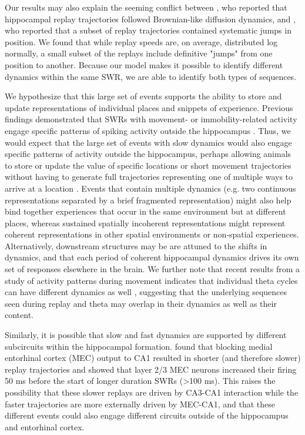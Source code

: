 \documentclass[9pt,lineno]{elife}
\begin{document}
Our results may also explain the seeming conflict between \cite{StellaHippocampalReactivationRandom2019}, who reported that hippocampal replay trajectories followed Brownian-like diffusion dynamics, and \cite{PfeifferAutoassociativedynamicsgeneration2015}, who reported that a subset of replay trajectories contained systematic jumps in position. We found that while replay speeds are, on average, distributed log normally, a small subset of the replays include definitive "jumps" from one position to another. Because our model makes it possible to identify different dynamics within the same SWR, we are able to identify both types of sequences.

We hypothesize that this large set of events supports the ability to store and update representations of individual places and snippets of experience. Previous findings demonstrated that SWRs with movement- or immobility-related activity engage specific patterns of spiking activity outside the hippocampus \citep{JadhavCoordinatedExcitationInhibition2016, YuDistincthippocampalcorticalmemory2017}. Thus, we would expect that the large set of events with slow dynamics would also engage specific patterns of activity outside the hippocampus, perhaps allowing animals to store or update the value of specific locations or short movement trajectories without having to generate full trajectories representing one of multiple ways to arrive at a location \citep{YuHippocampalcorticalinteraction2015}. Events that contain multiple dynamics (e.g. two continuous representations separated by a brief fragmented representation) might also help bind together experiences that occur in the same environment but at different places, whereas sustained spatially incoherent representations might represent coherent representations in other spatial environments \citep{KarlssonAwakereplayremote2009} or non-spatial experiences. Alternatively, downstream structures may be are attuned to the shifts in dynamics, and that each period of coherent hippocampal dynamics drives its own set of responses elsewhere in the brain. We further note that recent results from a study of activity patterns during movement indicates that individual theta cycles can have different dynamics as well \citep{WangAlternatingsequencesfuture2020a}, suggesting that the underlying sequences seen during replay and theta may overlap in their dynamics as well as their content.

Similarly, it is possible that slow and fast dynamics are supported by different subcircuits within the hippocampal formation. \cite{YamamotoDirectMedialEntorhinal2017} found that blocking medial entorhinal cortex (MEC) output to CA1 resulted in shorter (and therefore slower) replay trajectories and \cite{OlivaOriginGammaFrequency2018} showed that layer 2/3 MEC neurons increased their firing 50 ms before the start of longer duration SWRs (>100 ms). This raises the possibility that these slower replays are driven by CA3-CA1 interaction while the faster trajectories are more externally driven by MEC-CA1, and that these different events could also engage different circuits outside of the hippocampus and entorhinal cortex.
\end{document}
